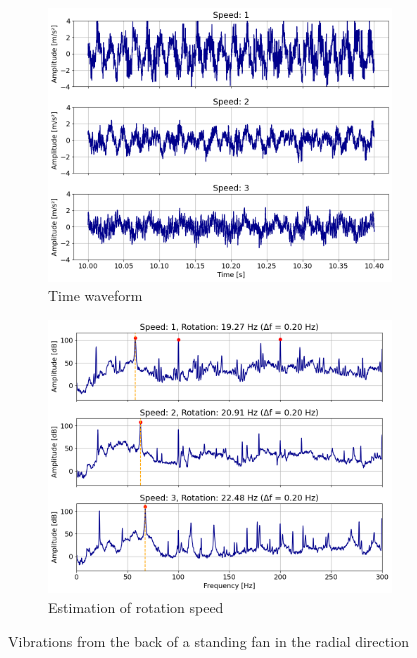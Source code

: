 \begin{figure}[h]
    \centering
    \begin{subfigure}[b]{0.49\textwidth}
        \includegraphics[width=\textwidth]{assets/results/standing-fan/waveform.png}
        \caption{Time waveform}
        \label{fig:evaluation:logger-waveform}
    \end{subfigure}
    \hfill
    \begin{subfigure}[b]{0.49\textwidth}
        \includegraphics[width=\textwidth]{assets/results/standing-fan/standing-fan-accel.png}
        \caption{Estimation of rotation speed}
        \label{fig:evaluation:logger-fan-speed}
    \end{subfigure}
    \caption{Vibrations from the back of a standing fan in the radial direction}
\end{figure}

